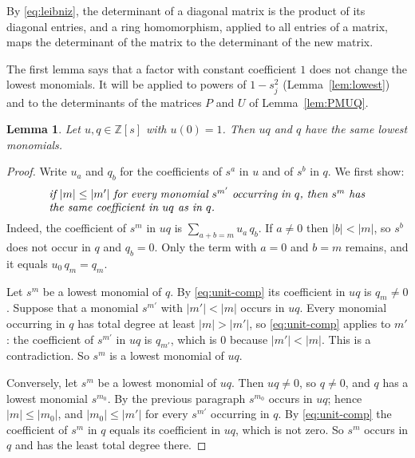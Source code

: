 \documentclass[11pt,reqno]{amsart}
\makeatletter
\newtheorem{lemma}[theorem]{Lemma}
\theoremstyle{definition}
\theoremstyle{remark}
\numberwithin{equation}{section}
\theoremstyle{named}
\theoremstyle{plain}
\renewcommand{\subsection}{\@startsection{subsection}{2}%
  \z@{1.0\linespacing\@plus.4\linespacing\@minus.15\linespacing}{-.5em}{\normalfont\bfseries}}
\newcommand{\Z}{\mathbb{Z}}
\newcommand{\abs}[1]{\lvert #1\rvert}
\makeatother
\begin{document}
By
\eqref{eq:leibniz}, the determinant of a diagonal matrix is the product of its diagonal entries, and
a ring homomorphism, applied to all entries of a matrix, maps the determinant of the matrix to the
determinant of the new matrix.

The first lemma says that a factor with constant coefficient $1$ does not change the lowest
monomials. It will be applied to powers of $1-s_j^{2}$ (Lemma~\ref{lem:lowest}) and to the
determinants of the matrices $P$ and $U$ of Lemma~\ref{lem:PMUQ}.

\begin{lemma}\label{lem:unit}
Let $u,q\in\Z[s]$ with $u(0)=1$. Then $uq$ and $q$ have the same lowest monomials.
\end{lemma}

\begin{proof}
Write $u_a$ and $q_b$ for the coefficients of $s^{a}$ in $u$ and of $s^{b}$ in $q$. We first show:
\begin{equation}\label{eq:unit-comp}
   \parbox{0.82\textwidth}{\emph{if $\abs{m}\le\abs{m'}$ for every monomial $s^{m'}$ occurring in
   $q$, then $s^{m}$ has the same coefficient in $uq$ as in $q$.}}
\end{equation}
Indeed, the coefficient of $s^{m}$ in $uq$ is $\sum_{a+b=m}u_a\,q_b$. If $a\ne0$ then
$\abs{b}<\abs{m}$, so $s^{b}$ does not occur in $q$ and $q_b=0$. Only the term with $a=0$ and $b=m$
remains, and it equals $u_0\,q_m=q_m$.

Let $s^{m}$ be a lowest monomial of $q$. By \eqref{eq:unit-comp} its coefficient in $uq$ is
$q_m\ne0$. Suppose that a monomial $s^{m'}$ with $\abs{m'}<\abs{m}$ occurs in $uq$. Every monomial
occurring in $q$ has total degree at least $\abs{m}>\abs{m'}$, so \eqref{eq:unit-comp} applies to
$m'$: the coefficient of $s^{m'}$ in $uq$ is $q_{m'}$, which is $0$ because $\abs{m'}<\abs{m}$. This
is a contradiction. So $s^{m}$ is a lowest monomial of $uq$.

Conversely, let $s^{m}$ be a lowest monomial of $uq$. Then $uq\ne0$, so $q\ne0$, and $q$ has a lowest
monomial $s^{m_0}$. By the previous paragraph $s^{m_0}$ occurs in $uq$; hence
$\abs{m}\le\abs{m_0}$, and $\abs{m_0}\le\abs{m'}$ for every $s^{m'}$ occurring in $q$. By
\eqref{eq:unit-comp} the coefficient of $s^{m}$ in $q$ equals its coefficient in $uq$, which is not
zero. So $s^{m}$ occurs in $q$ and has the least total degree there.
\end{proof}

\subsection{The agreement matrix}\label{subsec:agreement}
\end{document}
